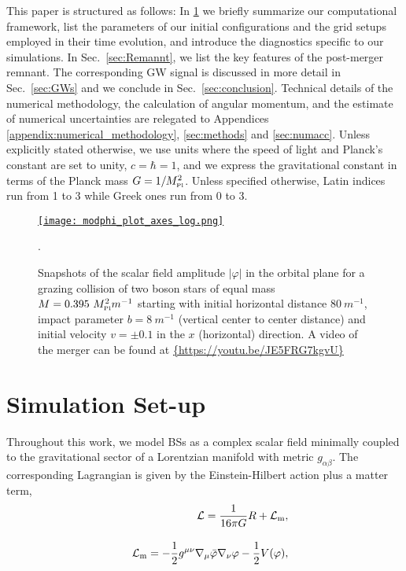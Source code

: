 \documentclass[11pt]{report}  %
\newcommand{\mpl}{M_{\mbox{\tiny Pl}}}
\begin{document}
This paper is structured as follows: In \cref{section:inital_data} we 
briefly summarize our computational framework, list the parameters
of our initial configurations and the grid setups employed in their
time evolution, and introduce the diagnostics specific
to our simulations. In Sec.~\ref{sec:Remannt},
we list the key features of the post-merger
remnant. The corresponding GW signal is discussed in more detail
in Sec.~\ref{sec:GWs} and we conclude in Sec.~\ref{sec:conclusion}.
Technical details of the numerical methodology, the calculation
of angular momentum, and the estimate of numerical uncertainties
are relegated to Appendices \ref{appendix:numerical_methodology},
\ref{sec:methods} and \ref{sec:numacc}.
Unless explicitly stated otherwise,
we use units where the speed of light and
Planck's constant are set to unity, $c=\hbar=1$, and we express the gravitational constant in terms of the Planck mass $G = 1/\mpl^2$. Unless specified otherwise, Latin indices run from 1 to 3 while Greek ones run from 0 to 3.

\begin{figure*}[t]
\begin{center}
\href{https://youtu.be/JE5FRG7kgvU}{
    {\texttt{[image: modphi\_plot\_axes\_log.png]}}
    }
\caption{
    Snapshots of the scalar field amplitude $|\varphi|$
    in the orbital plane for a
    grazing collision of two boson stars
    of equal mass $M=0.395~\mpl^2 m^{-1}$ starting with initial horizontal distance $80~m^{-1}$, impact
    parameter $b=8~m^{-1}$ (vertical center to center distance) and initial velocity $v=\pm 0.1$
    in the $x$ (horizontal) direction. A video of the merger can be found at \url{{https://youtu.be/JE5FRG7kgvU}}}.
\label{fig:Panellog}
\end{center}
\end{figure*}

\section{Simulation Set-up}\label{section:inital_data} 

Throughout this work, we model BSs as a complex scalar field
minimally coupled to the gravitational sector of a Lorentzian
manifold with metric $g_{\alpha\beta}$. The corresponding
Lagrangian is given by the Einstein-Hilbert action plus a
matter term,
%
\begin{eqnarray}
  &&\mathcal{L} = \frac{1}{16\pi G}R + \mathcal{L}_{\rm m},
  \\[10pt]
  &&\mathcal{L}_{\rm m} =-\frac{1}{2}g^{\mu\nu}\nabla_{\mu}{\bar{\varphi}}\nabla_{\nu}{\varphi}-\frac{1}{2} V(\varphi),
\end{eqnarray}
\end{document}
